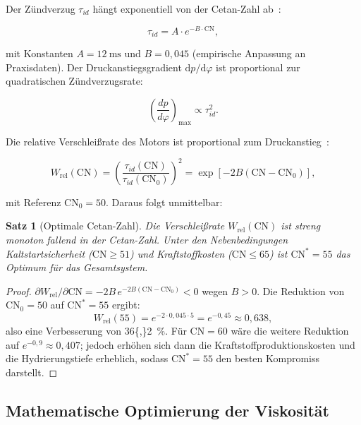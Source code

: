 ﻿\documentclass[12pt,a4paper]{article}
\newtheorem{theorem}{Satz}[section]
\newcommand{\CN}{\ensuremath{\mathrm{CN}}}
\begin{document}
Der Zündverzug $\tau_{id}$ hängt exponentiell von der Cetan-Zahl ab~\cite{heywood1988}:

\begin{equation}
  \tau_{id} = A \cdot e^{-B \cdot \CN},
  \label{eq:zuendverzug}
\end{equation}

mit Konstanten $A = \SI{12}{\ms}$ und $B = 0{,}045$ (empirische Anpassung
an Praxisdaten). Der Druckanstiegsgradient $\mathrm{d}p/\mathrm{d}\varphi$
ist proportional zur quadratischen Zündverzugsrate:

\begin{equation}
  \left(\frac{dp}{d\varphi}\right)_{\max} \propto \tau_{id}^2.
  \label{eq:druckanstieg}
\end{equation}

Die relative Verschlei\ss{}rate des Motors ist proportional zum
Druckanstieg~\cite{stanglmaier1999}:

\begin{equation}
  W_{\mathrm{rel}}(\CN) = \left(\frac{\tau_{id}(\CN)}{\tau_{id}(\CN_0)}\right)^2
  = \exp\!\left[-2B(\CN - \CN_0)\right],
  \label{eq:verschleiss_CN}
\end{equation}

mit Referenz $\CN_0 = 50$. Daraus folgt unmittelbar:

\begin{theorem}[Optimale Cetan-Zahl]
\label{thm:cetan}
Die Verschlei\ss{}rate $W_{\mathrm{rel}}(\CN)$ ist streng monoton fallend
in der Cetan-Zahl. Unter den Nebenbedingungen Kaltstartsicherheit
($\CN \geq 51$) und Kraftstoffkosten ($\CN \leq 65$) ist
$\CN^* = 55$ das Optimum für das Gesamtsystem.
\end{theorem}

\begin{proof}
$\partial W_{\mathrm{rel}} / \partial \CN = -2B \, e^{-2B(\CN-\CN_0)} < 0$
wegen $B > 0$. Die Reduktion von $\CN_0 = 50$ auf $\CN^* = 55$ ergibt:
\begin{equation}
  W_{\mathrm{rel}}(55) = e^{-2 \cdot 0{,}045 \cdot 5} = e^{-0{,}45} \approx 0{,}638,
\end{equation}
also eine Verbesserung von \SI{36{,}2}{\percent}. Für $\CN = 60$ wäre
die weitere Reduktion auf $e^{-0{,}9} \approx 0{,}407$; jedoch erhöhen
sich dann die Kraftstoffproduktionskosten und die Hydrierungstiefe erheblich,
sodass $\CN^* = 55$ den besten Kompromiss darstellt.
\end{proof}

\subsection{Mathematische Optimierung der Viskosität}
\label{sec:kraftstoff_viskositaet}
\end{document}
